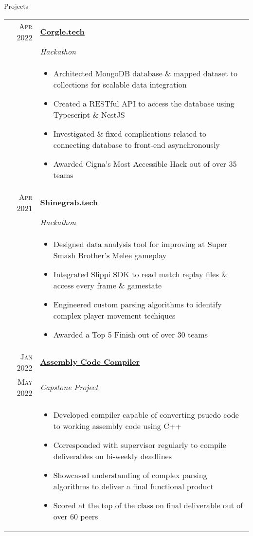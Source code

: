 \documentclass{resume}
\begin{document}
\begin{rSection}{Projects}
\small
{

	\begin{tabular}{r|p{15cm}}
		\textsc{Apr 2022} & \href{https://github.com/Sksosuh/Corgle} {\textbf{Corgle.tech}} \\ &
		 \textit{Hackathon} \\ &
		\begin{itemize}
			\item {Architected MongoDB database \& mapped dataset to collections for scalable data integration}
			\item {Created a RESTful API to access the database using Typescript \& NestJS}
			\item {Investigated \& fixed complications related to connecting database to front-end asynchronously}
			\item {Awarded Cigna's Most Accessible Hack out of over 35 teams}
		\end{itemize} \\ 
		\textsc{Apr 2021} & \href{https://github.com/mitchhit234/ShineGrabDotTech}{\textbf{Shinegrab.tech}} \\ &
		\textit{Hackathon} \\ &
		\begin{itemize}
			\item {Designed data analysis tool for improving at Super Smash Brother's Melee gameplay}
			\item {Integrated Slippi SDK to read match replay files \& access every frame \& gamestate}
			\item {Engineered custom parsing algorithms to identify complex player movement techiques}
			\item {Awarded a Top 5 Finish out of over 30 teams}
		\end{itemize}  \\
		\textsc{Jan 2022} & \href{https://github.com/RamiHanin07/CS4280-P4} {\textbf{Assembly Code Compiler}} \\ 
		\textsc{May 2022} & \textit{Capstone Project} \\ &
		\begin{itemize}
			\item{Developed compiler capable of converting psuedo code to working assembly code using C++}
			\item{Corresponded with supervisor regularly to compile deliverables on bi-weekly deadlines}
			\item{Showcased understanding of complex parsing algorithms to deliver a final functional product}
			\item{Scored at the top of the class on final deliverable out of over 60 peers }
		\end{itemize}
	\end{tabular}
}
\end{rSection}
\end{document}
